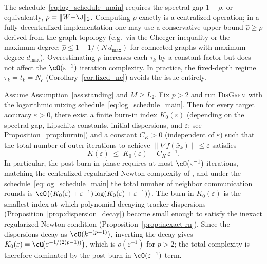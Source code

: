 \documentclass[review,onefignum,onetabnum]{siamart171218}
\begin{document}
\begin{remark}\label{rem:rho_knowledge}
The schedule~\eqref{eq:log_schedule_main} requires the spectral
gap $1{-}\rho$, or equivalently, $\rho=\|W{-}\J\|_2$.
Computing $\rho$ exactly is a centralized operation; in a fully
decentralized implementation one may use a conservative upper
bound $\hat\rho\ge\rho$ derived from the graph topology
(e.g.\ via the Cheeger inequality or the maximum degree:
$\hat\rho\le 1-1/(N\,d_{\max})$ for connected graphs with
maximum degree $d_{\max}$).
Overestimating $\rho$ increases each $\tau_k$ by a constant
factor but does not affect the $\cO(\varepsilon^{-1})$ iteration
complexity.
In practice, the fixed-depth regime $\tau_k{=}t_k{=}N_c$
(Corollary~\ref{cor:fixed_nc}) avoids the issue entirely.
\end{remark}

\begin{theorem}\label{thm:main}
Assume Assumption~\ref{ass:standing} and $M\ge L_2$.
Fix $p>2$ and run \textsc{DisGrem} with the logarithmic mixing schedule~\eqref{eq:log_schedule_main}.
Then for every target accuracy $\varepsilon>0$, there exist a finite burn-in index $K_0(\varepsilon)$
(depending on the spectral gap, Lipschitz constants, initial dispersions, and $\varepsilon$;
see Proposition~\ref{prop:burnin})
and a constant $C_K>0$ (independent of $\varepsilon$) such that the total number of
outer iterations to achieve $\|\nabla f(\bar x_k)\|\le \varepsilon$ satisfies
\[
K(\varepsilon)\;\le\; K_0(\varepsilon) + C_K\,\varepsilon^{-1}.
\]
In particular,
the post-burn-in phase requires at most $\cO(\varepsilon^{-1})$ iterations,
matching the centralized regularized Newton complexity of \citet{mishchenko2023rn},
and under the schedule~\eqref{eq:log_schedule_main} the total number of neighbor communication rounds is
$\cO\big((K_0(\varepsilon)+\varepsilon^{-1})\log(K_0(\varepsilon)+\varepsilon^{-1})\big)$.
The burn-in $K_0(\varepsilon)$ is the smallest index at which
polynomial-decaying tracker dispersions
(Proposition~\ref{prop:dispersion_decay}) become small enough to satisfy the
inexact regularized Newton condition (Proposition~\ref{prop:inexact-rn}).
Since the dispersions decay as $\cO(k^{-(p-1)})$, inverting the decay gives
$K_0(\varepsilon)=\cO\!\bigl(\varepsilon^{-1/(2(p-1))}\bigr)$,
which is $o(\varepsilon^{-1})$ for $p>2$; the total complexity is therefore
dominated by the post-burn-in $\cO(\varepsilon^{-1})$ term.
\end{theorem}
\end{document}

